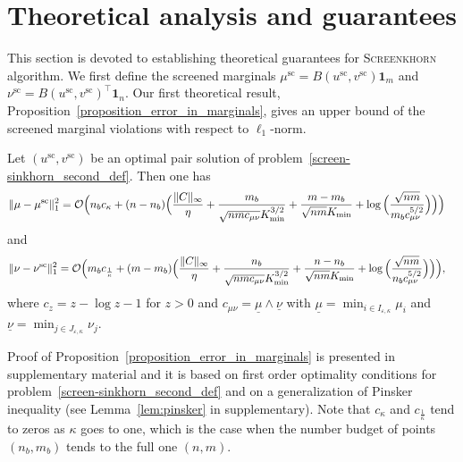 
\section{Theoretical analysis and guarantees} %
\label{sec:analysis_of_marginal_violations}

This section is devoted to establishing theoretical guarantees for \textsc{Screenkhorn} algorithm. %
We first define the screened marginals $\mu^{\text{sc}} = B(u^{\text{sc}}, v^{\text{sc}}) \mathbf 1_m$ and $\nu^{\text{sc}} = B(u^{\text{sc}}, v^{\text{sc}})^\top \mathbf 1_n.$ 
Our first theoretical result, Proposition~\ref{proposition_error_in_marginals}, gives an upper bound of the screened marginal violations with respect to $\ell_1$-norm.

\begin{proposition}
\label{proposition_error_in_marginals}
Let $(u^{\text{sc}}, v^{\text{sc}})$ be an optimal pair solution of problem~\eqref{screen-sinkhorn_second_def}.
Then one has 
\begin{align}
\label{marginal-error-mu}
{\|{\mu} -{\mu}^{\text{sc}}\|^2_1} = \mathcal{O}\Big(n_bc_\kappa + (n- n_b) \Big(\frac{\|C\|_\infty}{\eta} + \frac{m_b}{\sqrt{nmc_{\mu\nu}}K_{\min}^{3/2}} &+ \frac{m-m_b}{\sqrt{nm}K_{\min}}
 + \log\Big(\frac{\sqrt{nm}}{m_bc_{\mu\nu}^{5/2}} 
\Big)\Big)\Big)
\end{align}
and 
\begin{align}
\label{marginal-error-nu}
{\|{\nu} -{\nu}^{\text{sc}}\|^2_1} = \mathcal{O}\Big(m_bc_{\frac1\kappa} + (m- m_b) \Big(\frac{\|C\|_\infty}{\eta} + \frac{n_b}{\sqrt{nmc_{\mu\nu}}K_{\min}^{3/2}} &+ \frac{n-n_b}{\sqrt{nm}K_{\min}}
 + \log\Big(\frac{\sqrt{nm}}{n_b c_{\mu\nu}^{5/2}}
\Big)\Big)\Big),
\end{align}
where $c_z = z - \log z - 1$ for $z>0$ and $c_{\mu\nu} = \underline{\mu}\wedge \underline{\nu}$ with $\underline{\mu} = \min_{i\in I_{\varepsilon,\kappa}}\mu_i$ and $\underline{\nu} = \min_{j\in J_{\varepsilon,\kappa}}\nu_j$.

\end{proposition}
Proof of Proposition~\ref{proposition_error_in_marginals} is presented in supplementary material and it is based on first order optimality conditions for problem~\eqref{screen-sinkhorn_second_def} and on a generalization of Pinsker inequality (see Lemma~\ref{lem:pinsker} in supplementary).
Note that $c_\kappa$ and $c_{\frac 1\kappa}$ tend to zeros as $\kappa$ goes to one, which is the case when the number budget of points $(n_b,m_b)$ tends to the full one $(n,m)$.

